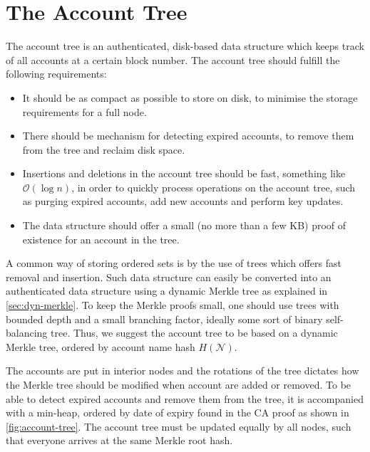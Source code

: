 \documentclass{style/kththesis}
\begin{document}
\section{The Account Tree}
\label{account-tree}
The account tree is an authenticated, disk-based data structure which keeps track of all accounts at a certain block number. The account tree should fulfill the following requirements:

\begin{itemize}
\item It should be as compact as possible to store on disk, to minimise the storage requirements for a full node.
\item There should be mechanism for detecting expired accounts, to remove them from the tree and reclaim disk space.
\item Insertions and deletions in the account tree should be fast, something like $\mathcal{O}(\log n)$, in order to quickly process operations on the account tree, such as purging expired accounts, add new accounts and perform key updates.
\item The data structure should offer a small (no more than a few KB) proof of existence for an account in the tree.
\end{itemize}

A common way of storing ordered sets is by the use of trees which offers fast removal and insertion. Such data structure can easily be converted into an authenticated data structure using a dynamic Merkle tree as explained in \cref{sec:dyn-merkle}. To keep the Merkle proofs small, one should use trees with bounded depth and a small branching factor, ideally some sort of binary self-balancing tree. Thus, we suggest the account tree to be based on a dynamic Merkle tree, ordered by account name hash $H(\mathcal{N})$.

The accounts are put in interior nodes and the rotations of the tree dictates how the Merkle tree should be modified when account are added or removed. To be able to detect expired accounts and remove them from the tree, it is accompanied with a min-heap, ordered by date of expiry found in the CA proof as shown in \cref{fig:account-tree}. The account tree must be updated equally by all nodes, such that everyone arrives at the same Merkle root hash.
\end{document}
